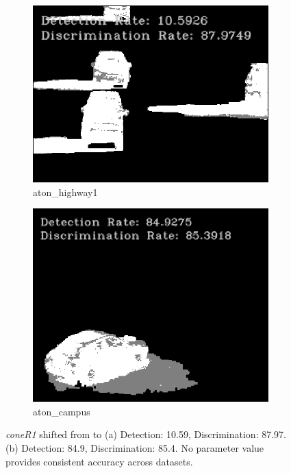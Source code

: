 \begin{figure}
  \centering
  \begin{subfigure}{.49\linewidth}
    \includegraphics[width=1\linewidth]{figures/background/phys_highway1_680.png}
    \caption{aton\_highway1}
  \end{subfigure}
  \hfill
  \begin{subfigure}{.45\linewidth}
    \includegraphics[width=1\linewidth]{figures/background/phys_campus_680.png}
    \caption{aton\_campus}
  \end{subfigure}
  \caption{\textit{coneR1} shifted from  to  (a) Detection: 10.59, Discrimination: 87.97. (b) Detection: 84.9, Discrimination: 85.4. No parameter value provides consistent accuracy across datasets.}
  \label{fig:coner168}
\end{figure}

